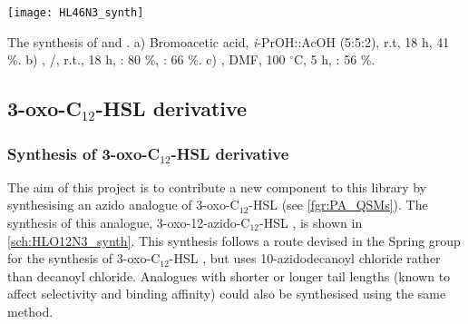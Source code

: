 \begin{scheme}[H]
	\begin{center}
		\texttt{[image: HL46N3\_synth]}
		\caption{The synthesis of  and .
		a) Bromoacetic acid, \textit{i}-PrOH::AcOH (5:5:2), r.t, 18 h, 41 \%.
		b) , /, r.t., 18 h,  : 80 \%,  : 66 \%.
		c) , DMF, 100 $^{\circ}$C, 5 h,  : 56 \%.
		\label{sch:HL46N3_synth}}
	\end{center}
\end{scheme}

\subsection{3-oxo-C$_{12}$-HSL derivative }

\subsubsection{Synthesis of 3-oxo-C$_{12}$-HSL derivative }

The aim of this project is to contribute a new component to this library by synthesising an azido analogue of 3-oxo-C$_{12}$-HSL  (see \ref{fgr:PA_QSMs}). The synthesis of this analogue, 3-oxo-12-azido-C$_{12}$-HSL , is shown in \ref{sch:HLO12N3_synth}\cite{Hodgkinson2011b, Amara2009,Garner2011}. This synthesis follows a route devised in the Spring group for the synthesis of 3-oxo-C$_{12}$-HSL \cite{Hodgkinson2011b}, but uses 10-azidodecanoyl chloride  rather than decanoyl chloride. Analogues with shorter or longer tail lengths (known to affect selectivity and binding affinity) could also be synthesised using the same method. 


